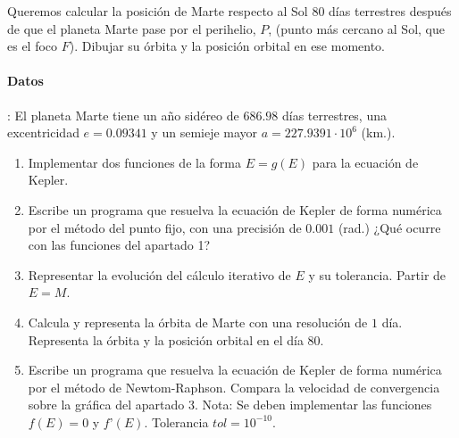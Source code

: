Queremos calcular la posición de Marte respecto al Sol 80 días terrestres después de que el planeta Marte pase por el perihelio, $P$, (punto más cercano al Sol, que es el foco $F$). Dibujar su órbita y la posición orbital en ese momento.
\paragraph{Datos}: El planeta Marte tiene un año sidéreo de $686.98$ días terrestres, una excentricidad $e=0.09341$ y un semieje mayor $a= 227.9391 \cdot 10^6 $ (km.).

\begin{enumerate}
    \item Implementar  dos funciones de la forma $E=g(E)$ para la ecuación de Kepler.
    \item Escribe un programa que resuelva la ecuación de Kepler de forma numérica por el método del punto fijo, con una precisión de $0.001$ (rad.) ¿Qué ocurre con las funciones del apartado 1?
    \item Representar la evolución del cálculo iterativo de $E$ y su tolerancia. Partir de $E=M$.
    \item Calcula y representa la órbita de Marte con una resolución de $1$ día. Representa la órbita y la posición orbital en el día $80$.
    \item Escribe un programa  que resuelva la ecuación de Kepler de forma numérica por el método de Newtom-Raphson. Compara la velocidad de convergencia sobre la gráfica del apartado 3. Nota: Se deben implementar las funciones $f(E)=0$ y $f ’(E)$. Tolerancia $tol=10^{-10}$.
\end{enumerate}


